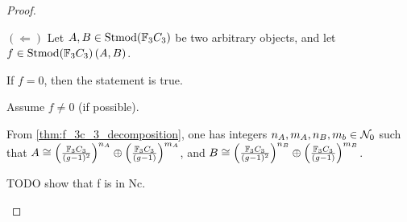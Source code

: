 \begin{proof}
\begin{enumerate}
{            \( ( \Leftarrow ) \) Let \( A, B \in \operatorname{Stmod}({\mathbb{F}}_3C_3) \) be two arbitrary objects, and let \( f \in \operatorname{Stmod}({\mathbb{F}}_3C_3)\left( A, B \right) \).

            If \( f = 0 \), then the statement is true. 
            
            Assume \( f \neq 0 \) (if possible). %

            From \autoref{thm:f_3c_3_decomposition}, one has integers \( n_A, m_A, n_B, m_b \in {\mathcal{N}}_0 \) such that \( A \cong \left( \frac{{\mathbb{F}}_3C_3}{(g - 1)^2} \right)^{n_A} \oplus \left( \frac{{\mathbb{F}}_3C_3}{(g - 1)} \right)^{m_A} \), and \( B \cong \left( \frac{{\mathbb{F}}_3C_3}{(g - 1)^2} \right)^{n_B} \oplus \left( \frac{{\mathbb{F}}_3C_3}{(g - 1)} \right)^{m_B} \).

            TODO show that f is in Nc.
        }
    \end{enumerate}
\end{proof}